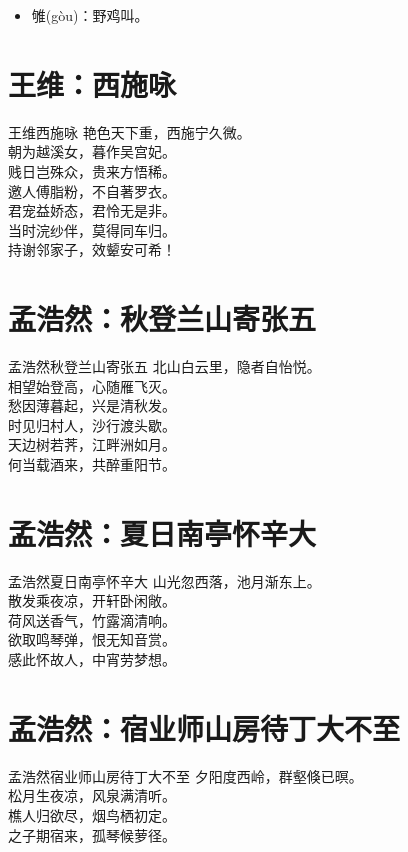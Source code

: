 \documentclass[12pt,oneside,a5paper]{book}
\begin{document}
\begin{itemize}
\item 雊(gòu)：野鸡叫。
\end{itemize}

\chapter{王维：西施咏}
\begin{poemzh}{王维}{西施咏}
艳色天下重，西施宁久微。\\
朝为越溪女，暮作吴宫妃。\\
贱日岂殊众，贵来方悟稀。\\
邀人傅脂粉，不自著罗衣。\\
君宠益娇态，君怜无是非。\\
当时浣纱伴，莫得同车归。\\
持谢邻家子，效颦安可希！\\ 
\end{poemzh}

\chapter{孟浩然：秋登兰山寄张五}
\begin{poemzh}{孟浩然}{秋登兰山寄张五}
北山白云里，隐者自怡悦。\\
相望始登高，心随雁飞灭。\\
愁因薄暮起，兴是清秋发。\\
时见归村人，沙行渡头歇。\\
天边树若荠，江畔洲如月。\\
何当载酒来，共醉重阳节。\\ 
\end{poemzh}

\chapter{孟浩然：夏日南亭怀辛大}
\begin{poemzh}{孟浩然}{夏日南亭怀辛大}
山光忽西落，池月渐东上。\\
散发乘夜凉，开轩卧闲敞。\\
荷风送香气，竹露滴清响。\\
欲取鸣琴弹，恨无知音赏。\\
感此怀故人，中宵劳梦想。\\ 
\end{poemzh}

\chapter{孟浩然：宿业师山房待丁大不至}
\begin{poemzh}{孟浩然}{宿业师山房待丁大不至}
夕阳度西岭，群壑倏已暝。\\
松月生夜凉，风泉满清听。\\
樵人归欲尽，烟鸟栖初定。\\
之子期宿来，孤琴候萝径。\\ 
\end{poemzh}
\end{document}
